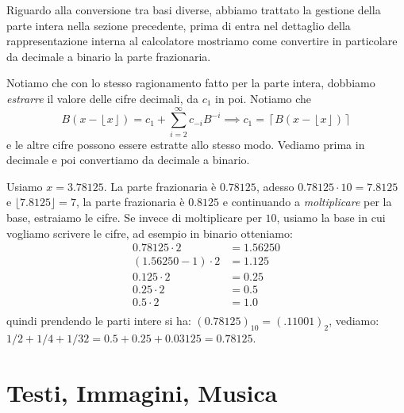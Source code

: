 Riguardo alla conversione tra basi diverse, abbiamo trattato la gestione della parte intera nella sezione precedente, prima di entra nel dettaglio della rappresentazione interna al calcolatore mostriamo come convertire in particolare da decimale a binario la parte frazionaria.

Notiamo che con lo stesso ragionamento fatto per la parte intera, dobbiamo \emph{estrarre} il valore delle cifre decimali, da $c_1$ in poi. Notiamo che
\[ B(x - \left\lfloor x \right \rfloor) = c_1 + \sum_{i=2}^{\infty} c_{-i}B^{-i} \implies c_1 = \left\lceil B(x - \left\lfloor x \right\rfloor) \right\rceil \]
e le altre cifre possono essere estratte allo stesso modo. Vediamo prima in decimale e poi convertiamo da decimale a binario.

\begin{ex}
	Usiamo $x = 3.78125$. La parte frazionaria è $0.78125$, adesso $0.78125\cdot 10 = 7.8125$ e $\lfloor 7.8125 \rfloor = 7$, la parte frazionaria è $0.8125$ e continuando a \emph{moltiplicare} per la base, estraiamo le cifre.
	Se invece di moltiplicare per $10$, usiamo la base in cui vogliamo scrivere le cifre, ad esempio in binario otteniamo:
 \begin{align*}
		 0.78125 \cdot 2 &= 1.56250\\
		 (1.56250-1) \cdot 2 &= 1.125\\
		 0.125 \cdot 2 &= 0.25\\
		 0.25  \cdot 2 &= 0.5\\
		 0.5 \cdot 2 &= 1.0\\
\end{align*}
quindi prendendo le parti intere si ha: $(0.78125)_{10} = (.11001)_2$, vediamo: $1/2+1/4+1/32 = 0.5 + 0.25 + 0.03125 = 0.78125$.
\end{ex}


\section{Testi, Immagini, Musica}

